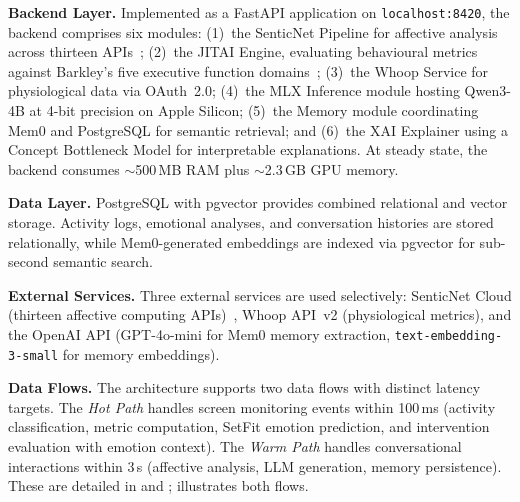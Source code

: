 \textbf{Backend Layer.} Implemented as a FastAPI application on \texttt{localhost:8420}, the backend comprises six modules: (1)~the SenticNet Pipeline for affective analysis across thirteen APIs~\cite{cambria2024}; (2)~the JITAI Engine, evaluating behavioural metrics against Barkley's five executive function domains~\cite{barkley2010}; (3)~the Whoop Service for physiological data via OAuth~2.0; (4)~the MLX Inference module hosting Qwen3-4B at 4-bit precision on Apple Silicon; (5)~the Memory module coordinating Mem0 and PostgreSQL for semantic retrieval; and (6)~the XAI Explainer using a Concept Bottleneck Model for interpretable explanations. At steady state, the backend consumes $\sim$500\,MB RAM plus $\sim$2.3\,GB GPU memory.

\textbf{Data Layer.} PostgreSQL with pgvector provides combined relational and vector storage. Activity logs, emotional analyses, and conversation histories are stored relationally, while Mem0-generated embeddings are indexed via pgvector for sub-second semantic search.

\textbf{External Services.} Three external services are used selectively: SenticNet Cloud (thirteen affective computing APIs)~\cite{cambria2024}, Whoop API~v2 (physiological metrics), and the OpenAI API (GPT-4o-mini for Mem0 memory extraction, \texttt{text-embedding-3-small} for memory embeddings).

\textbf{Data Flows.} The architecture supports two data flows with distinct latency targets. The \emph{Hot Path} handles screen monitoring events within 100\,ms (activity classification, metric computation, SetFit emotion prediction, and intervention evaluation with emotion context). The \emph{Warm Path} handles conversational interactions within 3\,s (affective analysis, LLM generation, memory persistence). These are detailed in  and ;  illustrates both flows.


